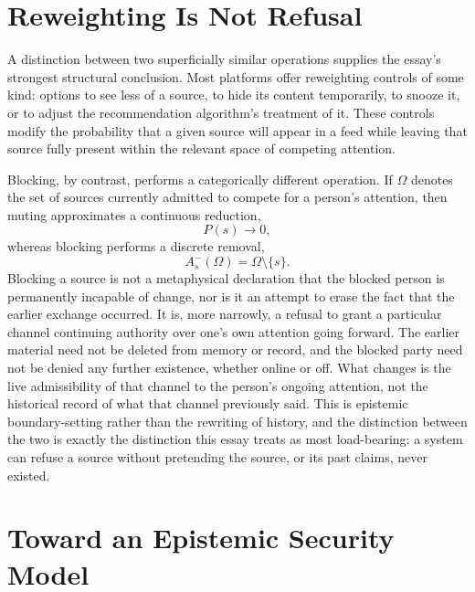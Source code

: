 \documentclass[11pt]{article}
\begin{document}
\section{Reweighting Is Not Refusal}

A distinction between two superficially similar operations supplies the essay's strongest structural conclusion. Most platforms offer reweighting controls of some kind: options to see less of a source, to hide its content temporarily, to snooze it, or to adjust the recommendation algorithm's treatment of it. These controls modify the probability that a given source will appear in a feed while leaving that source fully present within the relevant space of competing attention.

Blocking, by contrast, performs a categorically different operation. If \(\Omega\) denotes the set of sources currently admitted to compete for a person's attention, then muting approximates a continuous reduction,
\[
P(s) \rightarrow 0,
\]
whereas blocking performs a discrete removal,
\[
A_s^{-}(\Omega) = \Omega \setminus \{s\}.
\]
Blocking a source is not a metaphysical declaration that the blocked person is permanently incapable of change, nor is it an attempt to erase the fact that the earlier exchange occurred. It is, more narrowly, a refusal to grant a particular channel continuing authority over one's own attention going forward. The earlier material need not be deleted from memory or record, and the blocked party need not be denied any further existence, whether online or off. What changes is the live admissibility of that channel to the person's ongoing attention, not the historical record of what that channel previously said. This is epistemic boundary-setting rather than the rewriting of history, and the distinction between the two is exactly the distinction this essay treats as most load-bearing: a system can refuse a source without pretending the source, or its past claims, never existed.

\section{Toward an Epistemic Security Model}
\end{document}
